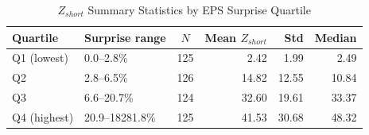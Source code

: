 \begin{table}[htbp]
\centering
\caption{$Z_{short}$ Summary Statistics by EPS Surprise Quartile}
\label{tab:quartile_stats}
\begin{tabular}{llcrrr}
\toprule
Quartile & Surprise range & $N$ & Mean $Z_{short}$ & Std & Median \\
\midrule
Q1 (lowest) & 0.0–2.8\% & 125 & 2.42 & 1.99 & 2.49 \\
Q2 & 2.8–6.5\% & 126 & 14.82 & 12.55 & 10.84 \\
Q3 & 6.6–20.7\% & 124 & 32.60 & 19.61 & 33.37 \\
Q4 (highest) & 20.9–18281.8\% & 125 & 41.53 & 30.68 & 48.32 \\
\bottomrule
\end{tabular}
\end{table}
